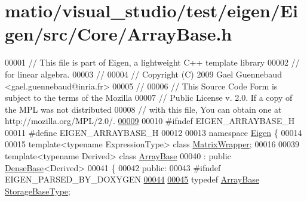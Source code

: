 \hypertarget{matio_2visual__studio_2test_2eigen_2_eigen_2src_2_core_2_array_base_8h_source}{}\section{matio/visual\+\_\+studio/test/eigen/\+Eigen/src/\+Core/\+Array\+Base.h}
\label{matio_2visual__studio_2test_2eigen_2_eigen_2src_2_core_2_array_base_8h_source}

\begin{DoxyCode}
00001 \textcolor{comment}{// This file is part of Eigen, a lightweight C++ template library}
00002 \textcolor{comment}{// for linear algebra.}
00003 \textcolor{comment}{//}
00004 \textcolor{comment}{// Copyright (C) 2009 Gael Guennebaud <gael.guennebaud@inria.fr>}
00005 \textcolor{comment}{//}
00006 \textcolor{comment}{// This Source Code Form is subject to the terms of the Mozilla}
00007 \textcolor{comment}{// Public License v. 2.0. If a copy of the MPL was not distributed}
00008 \textcolor{comment}{// with this file, You can obtain one at http://mozilla.org/MPL/2.0/.}
\hyperlink{group___core___module_a73817b0bf0b959cab85c453302100101}{00009} 
00010 \textcolor{preprocessor}{#ifndef EIGEN\_ARRAYBASE\_H}
00011 \textcolor{preprocessor}{#define EIGEN\_ARRAYBASE\_H}
00012 
00013 \textcolor{keyword}{namespace }\hyperlink{namespace_eigen}{Eigen} \{ 
00014 
00015 \textcolor{keyword}{template}<\textcolor{keyword}{typename} ExpressionType> \textcolor{keyword}{class }\hyperlink{group___core___module_class_eigen_1_1_matrix_wrapper}{MatrixWrapper};
00016 
00039 \textcolor{keyword}{template}<\textcolor{keyword}{typename} Derived> \textcolor{keyword}{class }\hyperlink{group___core___module_class_eigen_1_1_array_base}{ArrayBase}
00040   : \textcolor{keyword}{public} \hyperlink{group___core___module_class_eigen_1_1_dense_base}{DenseBase}<Derived>
00041 \{
00042   \textcolor{keyword}{public}:
00043 \textcolor{preprocessor}{#ifndef EIGEN\_PARSED\_BY\_DOXYGEN}
\hyperlink{group___core___module_a5bce24aa0762399c48cde7777c21c9e2}{00044} 
\hyperlink{group___core___module_a7c296f02281624d9c76eb864ab7209ce}{00045}     \textcolor{keyword}{typedef} \hyperlink{group___core___module_class_eigen_1_1_array_base}{ArrayBase} \hyperlink{group___core___module_a7c296f02281624d9c76eb864ab7209ce}{StorageBaseType};

\end{DoxyCode}
